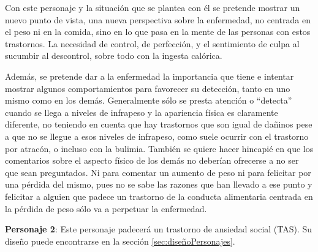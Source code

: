 \documentclass[12pt, a4paper,twoside,titlepage]{book}
\begin{document}
\begin{itemize}
{    Con este personaje y la situación que se plantea con él se pretende mostrar un nuevo punto de vista, una nueva perspectiva sobre la enfermedad, no centrada en el peso ni en la comida, sino en lo que pasa en la mente de las personas con estos trastornos. La necesidad de control, de perfección, y el sentimiento de culpa al sucumbir al descontrol, sobre todo con la ingesta calórica. 
    
    Además, se pretende dar a la enfermedad la importancia que tiene e intentar mostrar algunos comportamientos para favorecer su detección, tanto en uno mismo como en los demás. Generalmente sólo se presta atención o “detecta” cuando se llega a niveles de infrapeso y la apariencia física es claramente diferente, no teniendo en cuenta que hay trastornos que son igual de dañinos pese a que no se llegue a esos niveles de infrapeso, como suele ocurrir con el trastorno por atracón, o incluso con la bulimia. También se quiere hacer hincapié en que los comentarios sobre el aspecto físico de los demás no deberían ofrecerse a no ser que sean preguntados. Ni para comentar un aumento de peso ni para felicitar por una pérdida del mismo, pues no se sabe las razones que han llevado a ese punto y felicitar a alguien que padece un trastorno de la conducta alimentaria centrada en la pérdida de peso sólo va a perpetuar la enfermedad. }

\end{itemize}



\textbf{Personaje 2}: Este personaje padecerá un trastorno de ansiedad social (TAS). Su diseño puede encontrarse en la sección \ref{sec:diseñoPersonajes}.
\end{document}
